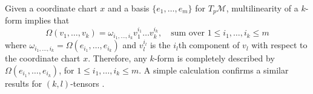 % 
%

Given a coordinate chart $x$ and a basis $\{ e_1,\dots,e_m\}$ for $T_{p}\mathcal M$, multilinearity of a $k$-form implies that
\begin{equation} \label{eq:2.6}
	\Omega(v_1,\dots,v_k) = \omega_{i_1,\dots,i_k} v_{1}^{i_1}\dots v_{k}^{i_k}, \quad \text{sum over }1 \leq i_1,\dots,i_k \leq m
\end{equation}
where $\omega_{i_1,\dots,i_k} = \Omega(e_{i_1},\dots,e_{i_k})$ and $v_{l}^{i_l}$ is the $i_l$th component of $v_l$ with respect to the coordinate chart $x$. Therefore, any $k$-form is completely described by $\Omega(e_{i_1},\dots,e_{i_k})$, for $1 \leq i_1,\dots,i_k \leq m$. A simple calculation confirms a similar results for $(k,l)$-tensors \cite{Wald:106274}.


